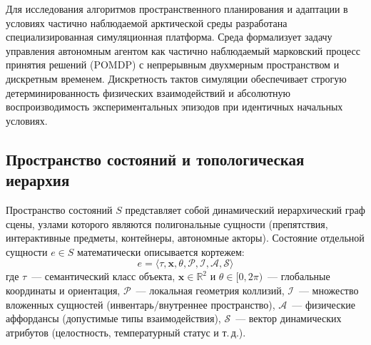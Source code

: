 \documentclass[11pt,a4paper]{article}
\begin{document}




Для исследования алгоритмов пространственного планирования и адаптации в условиях частично наблюдаемой арктической среды разработана специализированная симуляционная платформа. Среда формализует задачу управления автономным агентом как частично наблюдаемый марковский процесс принятия решений (POMDP) с непрерывным двухмерным пространством и дискретным временем. Дискретность тактов симуляции обеспечивает строгую детерминированность физических взаимодействий и абсолютную воспроизводимость экспериментальных эпизодов при идентичных начальных условиях.

\subsection{Пространство состояний и топологическая иерархия}
Пространство состояний $S$ представляет собой динамический иерархический граф сцены, узлами которого являются полигональные сущности (препятствия, интерактивные предметы, контейнеры, автономные акторы). Состояние отдельной сущности $e \in S$ математически описывается кортежем:
\begin{equation}
e = \langle \tau, \mathbf{x}, \theta, \mathcal{P}, \mathcal{I}, \mathcal{A}, \mathcal{S} \rangle
\end{equation}
где $\tau$~--- семантический класс объекта, $\mathbf{x} \in \mathbb{R}^{2}$ и $\theta \in [0, 2\pi)$~--- глобальные координаты и ориентация, $\mathcal{P}$~--- локальная геометрия коллизий, $\mathcal{I}$~--- множество вложенных сущностей (инвентарь/внутреннее пространство), $\mathcal{A}$~--- физические аффордансы (допустимые типы взаимодействия), $\mathcal{S}$~--- вектор динамических атрибутов (целостность, температурный статус и т.\,д.).
\end{document}
